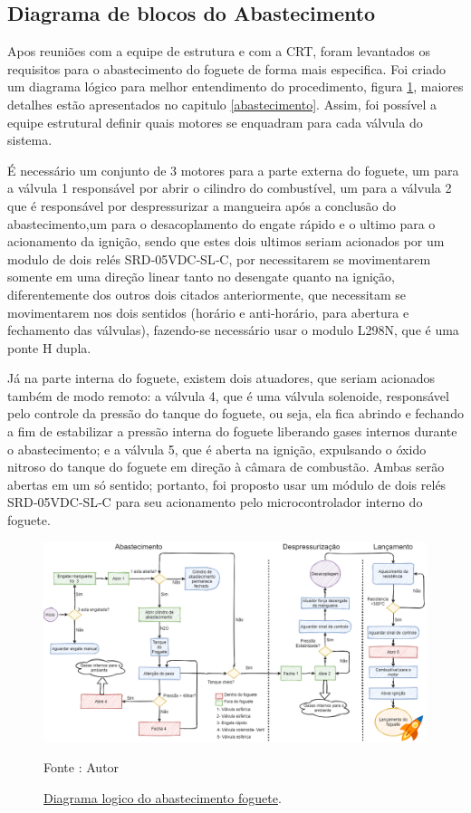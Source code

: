 \subsection{Diagrama de blocos do Abastecimento}
\par Apos reuniões com a equipe de estrutura e com a CRT, foram levantados os requisitos para o abastecimento do foguete de forma mais especifica. Foi criado um diagrama lógico para melhor entendimento do procedimento, figura \ref{fig:Abastecimento do fohuete}, maiores detalhes estão apresentados no capitulo \ref{abastecimento}. Assim, foi possível a equipe estrutural definir quais motores se enquadram para cada válvula do sistema.
\par É necessário um conjunto de 3 motores para a parte externa do foguete, um para a válvula 1 responsável por abrir o cilindro do combustível, um para a válvula 2 que é responsável por despressurizar a mangueira após a conclusão do abastecimento,um para o desacoplamento do engate rápido e o ultimo para o acionamento da ignição, sendo que estes dois ultimos seriam acionados por um modulo de dois relés SRD‑05VDC‑SL‑C, por necessitarem se movimentarem somente em uma direção linear tanto no desengate quanto na ignição, diferentemente dos outros dois citados anteriormente, que necessitam se movimentarem nos dois sentidos (horário e anti-horário, para abertura e fechamento das válvulas), fazendo-se necessário usar o modulo L298N, que é uma ponte H dupla.  
\par Já na parte interna do foguete, existem dois atuadores, que seriam acionados também de modo remoto: a válvula 4, que é uma válvula solenoide, responsável pelo controle da pressão do tanque do foguete, ou seja, ela fica abrindo e fechando a fim de estabilizar a pressão interna do foguete liberando gases internos durante o abastecimento; e a válvula 5, que é aberta na ignição, expulsando o óxido nitroso do tanque do foguete em direção à câmara de combustão. Ambas serão abertas em um só sentido; portanto, foi proposto usar um módulo de dois relés SRD‑05VDC‑SL‑C para seu acionamento pelo microcontrolador interno do foguete.
     


\begin{figure}[H]
  \centering
  \includegraphics[scale=0.35]{figuras/abastecimento .png}
  \caption{ \href{https://drive.google.com/file/d/1EhMWyoD2Ml5I2vsLA0MbNOR8LxuCMmC5/view?usp=sharing}{ Diagrama logico do abastecimento foguete}. } 
  {\footnotesize Fonte : Autor } 
  \label{fig:Abastecimento do fohuete}
\end{figure}

